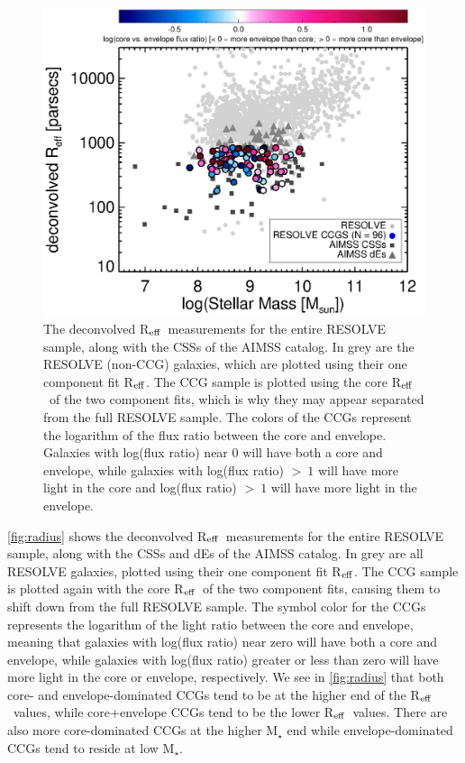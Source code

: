 \documentclass[iop,apj]{emulateapj}
\newcommand{\Reff}{R$_{\rm eff}$}
\begin{document}
\begin{figure}[hbpt!]
\begin{center}
\includegraphics{Reff_Mstars.eps}
\caption{The deconvolved \Reff\ measurements for the entire RESOLVE sample, along with the CSSs of the AIMSS catalog. In grey are the RESOLVE (non-CCG) galaxies, which are plotted using their one component fit \Reff. The CCG sample is plotted using the core \Reff\ of the two component fits, which is why they may appear separated from the full RESOLVE sample. The colors of the CCGs represent the logarithm of the flux ratio between the core and envelope. Galaxies with log(flux ratio) near 0 will have both a core and envelope, while galaxies with log(flux ratio) $>~1$ will have more light in the core and log(flux ratio) $>~1$ will have more light in the envelope.}
\label{fig:radius}
\end{center}
\end{figure}

\autoref{fig:radius} shows the deconvolved \Reff\ measurements for the entire RESOLVE sample, along with the CSSs and dEs of the AIMSS catalog. In grey are all RESOLVE galaxies, plotted using their one component fit \Reff. The CCG sample is plotted again with the core \Reff\ of the two component fits, causing them to shift down from the full RESOLVE sample. The symbol color for the CCGs represents the logarithm of the light ratio between the core and envelope, meaning that galaxies with log(flux ratio) near zero will have both a core and envelope, while galaxies with log(flux ratio) greater or less than zero will have more light in the core or envelope, respectively. We see in \autoref{fig:radius} that both core- and envelope-dominated CCGs tend to be at the higher end of the \Reff\ values, while core+envelope CCGs tend to be the lower \Reff\ values. There are also more core-dominated CCGs at the higher M$_{\star}$ end while envelope-dominated CCGs tend to reside at low M$_{\star}$.
\end{document}
